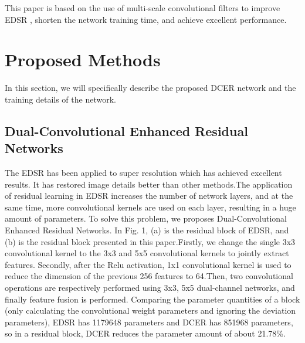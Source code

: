 \documentclass[runningheads,a4paper]{llncs}
\begin{document}
This paper is based on the use of multi-scale convolutional filters  to improve EDSR \cite{Lim2017Enhanced} , shorten the network training time, and achieve excellent performance.

\section{Proposed Methods}
In this section, we will specifically describe the proposed DCER network  and the training details of the network.

\subsection{Dual-Convolutional Enhanced Residual Networks}

The EDSR \cite{Lim2017Enhanced} has been applied to super resolution which has achieved excellent results. It has restored image details better than other methods.The application of residual learning in EDSR \cite{Lim2017Enhanced} increases the number of network layers, and at the same time, more convolutional kernels are used on each layer, resulting in a huge amount of parameters. To solve this problem, we proposes Dual-Convolutional Enhanced Residual Networks. In Fig. 1, (a) is the residual block of EDSR\cite{Lim2017Enhanced}, and (b) is the residual block presented in this paper.Firstly, we change the single 3x3 convolutional kernel to the 3x3 and 5x5 convolutional kernels to jointly extract features. Secondly, after the Relu activation, 1x1 convolutional kernel is used to reduce the dimension of the previous 256 features to 64.Then, two convolutional operations are respectively performed using 3x3, 5x5 dual-channel networks, and finally feature fusion is performed. Comparing the parameter quantities of a block (only calculating the convolutional weight parameters and ignoring the deviation parameters), EDSR\cite{Lim2017Enhanced} has 1179648 parameters and DCER has 851968 parameters, so in a residual block, DCER reduces the parameter amount of about 21.78\%.
\end{document}
